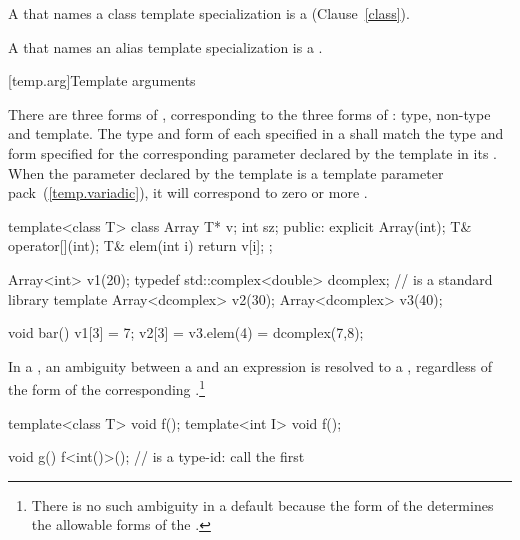 \pnum
{}%
A
that names a class template specialization is a
(Clause~\ref{class}).

\pnum
A  that names an alias template
specialization is a .

[temp.arg]{Template arguments}

\pnum
{}%
There are three forms of
,
corresponding to the three forms of
:
type, non-type and template.
The type and form of each
specified in a
shall match the type and form specified for the corresponding
parameter declared by the template in its
.
When the parameter declared by the template is a template
parameter pack~(\ref{temp.variadic}), it will correspond to zero or more
.
\begin{example}
\begin{codeblock}
template<class T> class Array {
  T* v;
  int sz;
public:
  explicit Array(int);
  T& operator[](int);
  T& elem(int i) { return v[i]; }
};

Array<int> v1(20);
typedef std::complex<double> dcomplex;  //  is a standard library template
Array<dcomplex> v2(30);
Array<dcomplex> v3(40);

void bar() {
  v1[3] = 7;
  v2[3] = v3.elem(4) = dcomplex(7,8);
}
\end{codeblock}
\end{example}

\pnum
In a
,
an ambiguity between a
and an expression is resolved to a
,
regardless of the form of the corresponding
.\footnote{There is no such ambiguity in a default
because the form of the
determines the allowable forms of the
.}
\begin{example}
\begin{codeblock}
template<class T> void f();
template<int I> void f();

void g() {
  f<int()>();       //  is a type-id: call the first 
}
\end{codeblock}
\end{example}

